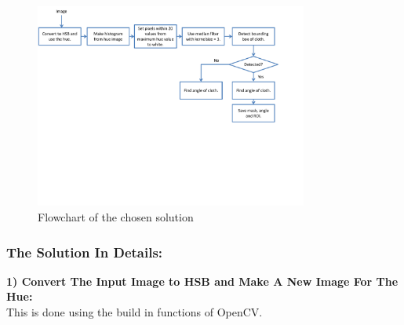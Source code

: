 

\begin{figure}[H]
\begin{center}
\leavevmode
\includegraphics[width=0.8\textwidth]{images/tabledetect_flowchart}
\end{center}
\caption{Flowchart of the chosen solution}
\label{fig:tabledetect_flowchart}
\end{figure}

\subsubsection{The Solution In Details:}
\textbf{1) Convert The Input Image to HSB and Make A New Image For The Hue:}\\
This is done using the build in functions of OpenCV\cite{opencv}.\\

